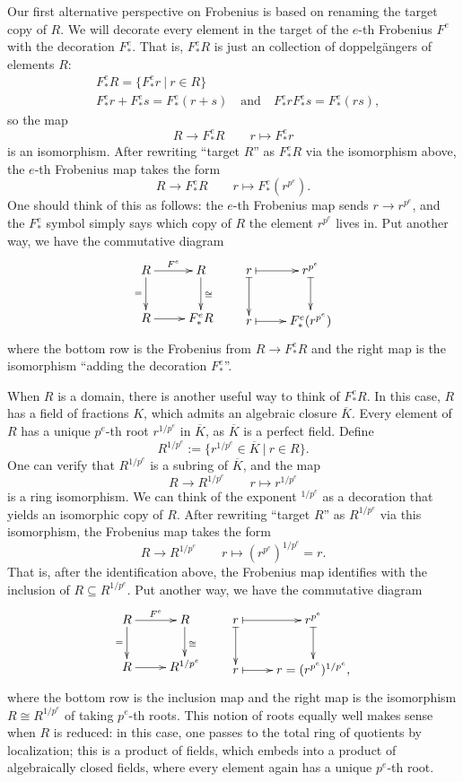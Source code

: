 \documentclass[12pt]{amsart}
\theoremstyle{definition}
\numberwithin{equation}{theorem}
\def\to{\longrightarrow}
\def\mapsto{\longmapsto}
\begin{document}
Our first alternative perspective on Frobenius is based on renaming the target copy of $R$. We will decorate every element in the target of the $e$-th Frobenius $F^e$ with the decoration $F^e_*$. That is, $F^e_*R$ is just an collection of doppelg\"{a}ngers of elements $R$:
\[\begin{aligned} &F^e_*R = \{ F^e_*r \ | \ r\in R\} \\
&F^e_*r + F^e_*s = F^e_*(r+s) \quad \text{and} \quad  F^e_*r  F^e_*s = F^e_*(rs), \end{aligned}\]
so the map 
\[ R \to F^e_*R \qquad r\mapsto F^e_*r\]
is an isomorphism.  After rewriting ``target $R$'' as $F^e_*R$ via the isomorphism above, the $e$-th Frobenius map takes the form
\[ R \to F^e_*R \qquad r\mapsto F^e_*(r^{p^e}).\]
One should think of this as follows: the $e$-th Frobenius map sends $r\to r^{p^e}$, and the $F^e_*$ symbol simply says which copy of $R$  the element $r^{p^e}$ lives in.
Put another way, we have the commutative diagram
\[ \xymatrix{ R \ar[d]_-{=} \ar[r]^-{F^e}  & R \ar[d]^{\cong} \\ R \ar[r]^-{} & F^e_*R} \qquad  \xymatrix{ r \ar@{|->}[r]  \ar@{|->}[d] & r^{p^e}  \ar@{|->}[d] \\ r  \ar@{|->}[r] &F^e_*(r^{p^e})} \]
where the bottom row is the Frobenius from $R \to F^e_*R$ and the right map is the isomorphism ``adding the decoration $F^e_*$''.

When $R$ is a domain, there is another useful way to think of $F^e_*R$. In this case, $R$ has a field of fractions $K$, which admits an algebraic closure $\overline{K}$. Every element of $R$ has a unique $p^e$-th root $r^{1/p^e}$ in $\overline{K}$, as $\overline{K}$ is a perfect field. Define
\[ R^{1/p^e} := \{ r^{1/p^e}\in \overline{K} \ | \ r\in R\}.\]
One can verify that $R^{1/p^e}$ is a subring of $\overline{K}$, and the map
\[ R \to R^{1/p^e} \qquad r\mapsto r^{1/p^e}\]
is a ring isomorphism. We can think of the exponent ${}^{1/p^e}$ as a decoration that yields an isomorphic copy of $R$. After rewriting ``target $R$'' as $R^{1/p^e}$ via this isomorphism, the Frobenius map takes the form
\[ R \to R^{1/p^e} \qquad r\mapsto (r^{p^e})^{1/p^e} = r.\]
That is, after the identification above, the Frobenius map identifies with the inclusion of ${R\subseteq R^{1/p^e}}$. Put another way, we have the commutative diagram
\[ \xymatrix{ R \ar[d]_-{=} \ar[r]^-{F^e}  & R \ar[d]^{\cong} \\ R \ar[r]^-{} & R^{1/p^e}} \qquad  \xymatrix{ r \ar@{|->}[r]  \ar@{|->}[d] & r^{p^e}  \ar@{|->}[d] \\ r  \ar@{|->}[r] &r = (r^{p^e})^{1/p^e},} \]
where the bottom row is the inclusion map and the right map is the isomorphism $R \cong R^{1/p^e}$ of taking $p^e$-th roots. This notion of roots equally well makes sense when $R$ is reduced: in this case, one passes to the total ring of quotients by localization; this is a product of fields, which embeds into a product of algebraically closed fields, where every element again has a unique $p^e$-th root.
\end{document}
